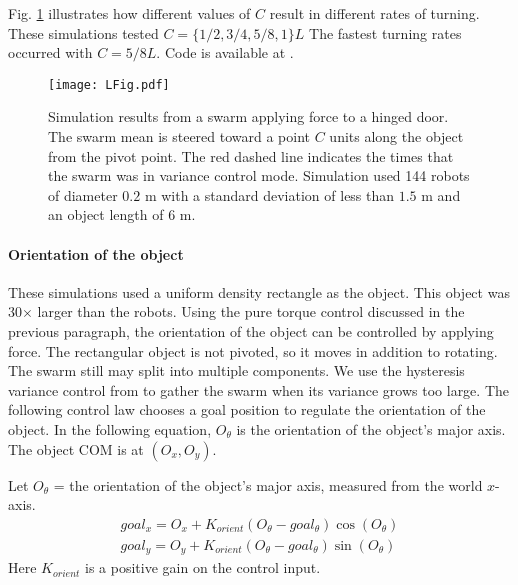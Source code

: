  Fig. \ref{fig:LFig} illustrates how different values of $C$ result in different rates of turning. These simulations tested $C = \{1/2, 3/4, 5/8, 1\}L$  The fastest turning rates occurred with  $C =  5/8L$. Code is available at \cite{Shahrokhi16torque}.



\begin{figure}
\begin{center}
	\texttt{[image: LFig.pdf]}
\end{center}
\vspace{-1em}
\caption{\label{fig:LFig}
Simulation results from a swarm applying force to a hinged door. 
The swarm mean is steered toward a point $C$ units along the object from the pivot point. The red dashed line indicates the times that the swarm was in variance control mode.
 Simulation used 144 robots of diameter $0.2$ m with a standard deviation of less than $1.5$ m and an object length of $6$ m.
}
\vspace{-1em}
\end{figure}


\paragraph{Orientation of the object}
These simulations used a uniform density rectangle as the object. This object was 30$\times$ larger than the robots.
Using the pure torque control discussed in the previous paragraph, the orientation of the object can be controlled by applying force. 
The rectangular object is not pivoted, so it moves in addition to rotating. 
 The swarm still may split into multiple components.
  We use the hysteresis variance control from \cite{ShahrokhiIROS2015}  to gather the swarm when its variance grows too large. 
  The following control law chooses a goal position to regulate the orientation of the object.  In the following equation, $O_{\theta}$ is the orientation of the object's major axis. The object COM is at $(O_x,O_y)$.

Let $O_{\theta}$ = the orientation of the object's major axis, measured from the world $x$-axis.
\begin{align}\nonumber
goal_x = O_x +  K_{orient}  (O_{\theta} - goal_\theta ) \cos(O_{\theta}) \\
goal_y = O_y +  K_{orient}  ( O_{\theta} -goal_\theta  ) \sin(O_{\theta})
\end{align}
Here $K_{orient}$ is a positive gain on the control input.  


